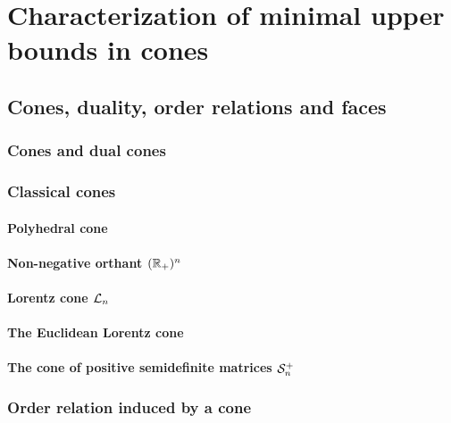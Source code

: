 \documentclass[main]{subfiles}
\begin{document}
\chapter{Characterization of minimal upper bounds in cones}
\label{chap:mub_charact}

\section{Cones, duality, order relations and faces }
\label{sec:cone_dual_recall}

\subsection{Cones and dual cones}




\subsection{Classical cones}

\label{sec:classical_cones}

\subsubsection*{Polyhedral cone}


\subsubsection*{Non-negative orthant $(\mathbb{R}_+)^n$}

\subsubsection*{Lorentz cone $\mathcal{L}_n$}

\subsubsection*{The Euclidean Lorentz cone}

\subsubsection*{The cone of positive semidefinite matrices $\mathcal{S}_n^+$}


\subsection{Order relation induced by a cone}
\end{document}
